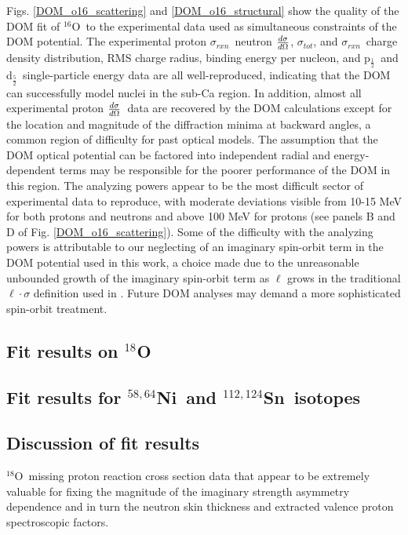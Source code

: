 \documentclass[twocolumn,secnumarabic,amssymb, nobibnotes, aps, prl,
superscriptaddress, nobalancelastpage]{revtex4}
\newcommand{\tot}{\ensuremath{\sigma_{tot}}}
\newcommand{\rxn}{\ensuremath{\sigma_{rxn}}}
\newcommand{\el}{\ensuremath{\frac{\lowercase{d}\sigma}{\lowercase{d}\Omega}}}
\newcommand{\oSix}{\ensuremath{^{16}}O}
\newcommand{\oEight}{\ensuremath{^{18}}O}
\newcommand{\niEightFour}{\ensuremath{^{58,64}}N\lowercase{i}}
\newcommand{\snTwelveFour}{\ensuremath{^{112,124}}S\lowercase{n}}
\newcommand{\pOne}{p\ensuremath{_{\frac{1}{2}}}}
\newcommand{\dFive}{d\ensuremath{_{\frac{5}{2}}}}
\begin{document}
Figs. \ref{DOM_o16_scattering} and \ref{DOM_o16_structural} show the
quality of the DOM fit of \oSix\ to the experimental data used as simultaneous
constraints of the DOM potential. The experimental proton \rxn\, neutron \el, \tot, 
and \rxn\, charge density distribution, RMS charge radius, binding energy per nucleon,
and \pOne\ and \dFive\ single-particle energy data are all well-reproduced,
indicating that the DOM can successfully model nuclei in the sub-Ca region.
In addition, almost all experimental proton \el\ data are recovered by the DOM
calculations except for the location and magnitude of the diffraction
minima at backward angles, a common region of difficulty for past optical
models. The assumption that the DOM optical potential can be factored into
independent radial and energy-dependent terms may be responsible for the poorer
performance of the DOM in this region. The analyzing powers appear to be the most
difficult sector of experimental data to reproduce, with moderate deviations
visible from 10-15 MeV for both protons and neutrons and above 100 MeV for
protons (see panels B and D of Fig. \ref{DOM_o16_scattering}). Some
of the difficulty with the analyzing powers is attributable to our neglecting of
an imaginary spin-orbit term in the DOM potential used in this work, a choice
made due to the unreasonable unbounded growth of the imaginary spin-orbit term
as $\ell$ grows in the traditional $\ell\cdot\sigma$ definition used in
\cite{KoningDelaroche}. Future DOM analyses may demand a more sophisticated spin-orbit treatment.

\subsection{Fit results on $^{18}$O}

\subsection{Fit results for \niEightFour\ and \snTwelveFour\ isotopes}

\subsection{Discussion of fit results}
\oEight\ missing proton reaction cross section data that appear to be
extremely valuable for fixing the magnitude of the imaginary strength asymmetry
dependence and in turn the neutron skin thickness and extracted valence proton
spectroscopic factors.
\end{document}
